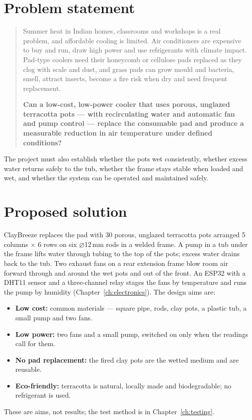 \documentclass[11pt,a4paper]{report}
\newcommand{\dia}{$\varnothing$}
\begin{document}
\section{Problem statement}
\begin{quote}
Summer heat in Indian homes, classrooms and workshops is a real problem, and affordable cooling is limited. Air conditioners are expensive to buy and run, draw high power and use refrigerants with climate impact. Pad-type coolers need their honeycomb or cellulose pads replaced as they clog with scale and dust, and grass pads can grow mould and bacteria, smell, attract insects, become a fire risk when dry and need frequent replacement.

\textbf{Can a low-cost, low-power cooler that uses porous, unglazed terracotta pots --- with recirculating water and automatic fan and pump control --- replace the consumable pad and produce a measurable reduction in air temperature under defined conditions?}
\end{quote}
The project must also establish whether the pots wet consistently, whether excess water returns safely to the tub, whether the frame stays stable when loaded and wet, and whether the system can be operated and maintained safely.

\section{Proposed solution}
ClayBreeze replaces the pad with 30 porous, unglazed terracotta pots arranged 5 columns $\times$ 6 rows on six \dia12\,mm rods in a welded frame. A pump in a tub under the frame lifts water through tubing to the top of the pots; excess water drains back to the tub. Two exhaust fans on a rear extension frame blow room air forward through and around the wet pots and out of the front. An ESP32 with a DHT11 sensor and a three-channel relay stages the fans by temperature and runs the pump by humidity (Chapter~\ref{ch:electronics}). The design aims are:
\begin{itemize}
\item \textbf{Low cost:} common materials --- square pipe, rods, clay pots, a plastic tub, a small pump and two fans.
\item \textbf{Low power:} two fans and a small pump, switched on only when the readings call for them.
\item \textbf{No pad replacement:} the fired clay pots are the wetted medium and are reusable.
\item \textbf{Eco-friendly:} terracotta is natural, locally made and biodegradable; no refrigerant is used.
\end{itemize}
These are aims, not results; the test method is in Chapter~\ref{ch:testing}.
\end{document}
